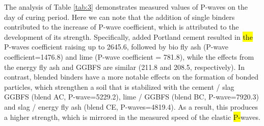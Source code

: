 \documentclass[materials,article,submit,pdftex,moreauthors]{Definitions/mdpi}
\begin{document}
The analysis of Table \ref{tab:3} demonstrates measured values of P-waves on the day  of curing period. Here we can note that the addition of single binders contributed to the increase of P-wave coefficient, which is attributed to the development of its strength. Specifically, added Portland cement resulted in \hl{the} P-waves coefficient raising up to 2645.6, followed by bio fly ash (P-wave coefficient=1476.8) and lime (P-wave coefficient = 781.8), while the effects from the energy fly ash and GGBFS are similar (211.8 and 208.5, respectively). In contrast, blended binders have a more notable effects on the formation of bonded particles, which strengthen a soil that is stabilized with the cement / slag GGBFS (blend AC, P-wave=5229.2), lime / GGBFS (blend BC, P-wave=7920.3) and slag / energy fly ash (blend CE, P-waves=4819.4). As a result, this produces a higher strength, which is mirrored in the measured speed of the elastic \hl{P-}waves. 
 
\end{document}
